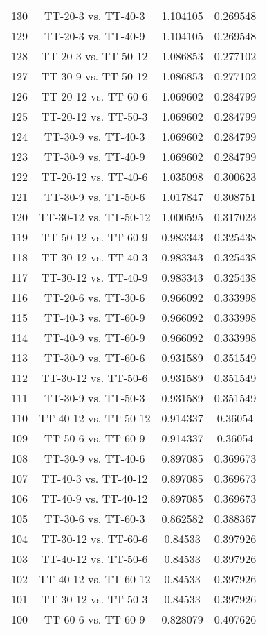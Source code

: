 \documentclass[a4paper,10pt]{article}
\begin{document}
\begin{landscape}
\begin{table}[!htp]
\begin{tabular}{cccc}
130&TT-20-3 vs. TT-40-3&1.104105&0.269548\\
129&TT-20-3 vs. TT-40-9&1.104105&0.269548\\
128&TT-20-3 vs. TT-50-12&1.086853&0.277102\\
127&TT-30-9 vs. TT-50-12&1.086853&0.277102\\
126&TT-20-12 vs. TT-60-6&1.069602&0.284799\\
125&TT-20-12 vs. TT-50-3&1.069602&0.284799\\
124&TT-30-9 vs. TT-40-3&1.069602&0.284799\\
123&TT-30-9 vs. TT-40-9&1.069602&0.284799\\
122&TT-20-12 vs. TT-40-6&1.035098&0.300623\\
121&TT-30-9 vs. TT-50-6&1.017847&0.308751\\
120&TT-30-12 vs. TT-50-12&1.000595&0.317023\\
119&TT-50-12 vs. TT-60-9&0.983343&0.325438\\
118&TT-30-12 vs. TT-40-3&0.983343&0.325438\\
117&TT-30-12 vs. TT-40-9&0.983343&0.325438\\
116&TT-20-6 vs. TT-30-6&0.966092&0.333998\\
115&TT-40-3 vs. TT-60-9&0.966092&0.333998\\
114&TT-40-9 vs. TT-60-9&0.966092&0.333998\\
113&TT-30-9 vs. TT-60-6&0.931589&0.351549\\
112&TT-30-12 vs. TT-50-6&0.931589&0.351549\\
111&TT-30-9 vs. TT-50-3&0.931589&0.351549\\
110&TT-40-12 vs. TT-50-12&0.914337&0.36054\\
109&TT-50-6 vs. TT-60-9&0.914337&0.36054\\
108&TT-30-9 vs. TT-40-6&0.897085&0.369673\\
107&TT-40-3 vs. TT-40-12&0.897085&0.369673\\
106&TT-40-9 vs. TT-40-12&0.897085&0.369673\\
105&TT-30-6 vs. TT-60-3&0.862582&0.388367\\
104&TT-30-12 vs. TT-60-6&0.84533&0.397926\\
103&TT-40-12 vs. TT-50-6&0.84533&0.397926\\
102&TT-40-12 vs. TT-60-12&0.84533&0.397926\\
101&TT-30-12 vs. TT-50-3&0.84533&0.397926\\
100&TT-60-6 vs. TT-60-9&0.828079&0.407626\\

\end{tabular}
\end{table}
\end{landscape}
\end{document}
